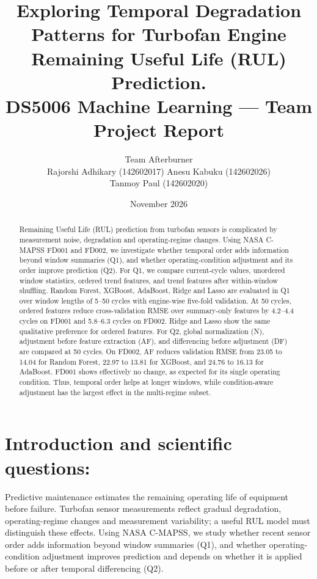 \documentclass[10pt,a4paper]{article}
\title{\textbf{Exploring Temporal Degradation Patterns for Turbofan Engine Remaining Useful Life (RUL) Prediction.}\\[4pt]\large DS5006 Machine Learning --- Team Project Report}
\author{Team Afterburner\\[3pt]\small Rajorshi Adhikary (142602017) \quad Anesu Kabuku (142602026)\\\small Tanmoy Paul (142602020)}
\date{November 2026}
\begin{document}
\maketitle

\begin{abstract}
Remaining Useful Life (RUL) prediction from turbofan sensors is complicated by measurement noise, degradation and operating-regime changes. Using NASA C-MAPSS FD001 and FD002, we investigate whether temporal order adds information beyond window summaries (Q1), and whether operating-condition adjustment and its order improve prediction (Q2). For Q1, we compare current-cycle values, unordered window statistics, ordered trend features, and trend features after within-window shuffling. Random Forest, XGBoost, AdaBoost, Ridge and Lasso are evaluated in Q1 over window lengths of 5--50 cycles with engine-wise five-fold validation. At 50 cycles, ordered features reduce cross-validation RMSE over summary-only features by 4.2--4.4 cycles on FD001 and 5.8--6.3 cycles on FD002. Ridge and Lasso show the same qualitative preference for ordered features. For Q2, global normalization (N), adjustment before feature extraction (AF), and differencing before adjustment (DF) are compared at 50 cycles. On FD002, AF reduces validation RMSE from 23.05 to 14.04 for Random Forest, 22.97 to 13.81 for XGBoost, and 24.76 to 16.13 for AdaBoost. FD001 shows effectively no change, as expected for its single operating condition. Thus, temporal order helps at longer windows, while condition-aware adjustment has the largest effect in the multi-regime subset.
\end{abstract}

\section{Introduction and scientific questions:}
Predictive maintenance estimates the remaining operating life of equipment before failure. Turbofan sensor measurements reflect gradual degradation, operating-regime changes and measurement variability; a useful RUL model must distinguish these effects. Using NASA C-MAPSS, we study whether recent sensor order adds information beyond window summaries (Q1), and whether operating-condition adjustment improves prediction and depends on whether it is applied before or after temporal differencing (Q2).
\end{document}
